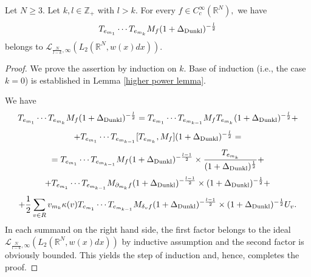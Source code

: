 \documentclass{amsart}
\begin{document}
\begin{lemma}\label{smoothness integer lemma} Let $N\geq3.$ Let $k,l\in\mathbb{Z}_+$ with $l>k.$ For every $f\in C^{\infty}_c(\mathbb{R}^N),$ we have
$$T_{e_{m_1}}\cdots T_{e_{m_k}}M_f(1+\Delta_{{\rm Dunkl}})^{-\frac{l}{2}}$$
belongs to $\mathcal{L}_{\frac{N}{l-k},\infty}(L_2(\mathbb{R}^N,w(x)dx)).$
\end{lemma}
\begin{proof} We prove the assertion by induction on $k.$ Base of induction (i.e., the case $k=0$) is established in Lemma \ref{higher power lemma}.

We have
$$T_{e_{m_1}}\cdots T_{e_{m_k}}M_f(1+\Delta_{{\rm Dunkl}})^{-\frac{l}{2}}=T_{e_{m_1}}\cdots T_{e_{m_{k-1}}}M_fT_{e_{m_k}}(1+\Delta_{{\rm Dunkl}})^{-\frac{l}{2}}+$$
$$+T_{e_{m_1}}\cdots T_{e_{m_{k-1}}}[T_{e_{m_k}},M_f](1+\Delta_{{\rm Dunkl}})^{-\frac{l}{2}}=$$
$$=T_{e_{m_1}}\cdots T_{e_{m_{k-1}}}M_f(1+\Delta_{{\rm Dunkl}})^{-\frac{l-1}{2}}\times\frac{T_{e_{m_k}}}{(1+\Delta_{{\rm Dunkl}})^{\frac12}}+$$
$$+T_{e_{m_1}}\cdots T_{e_{m_{k-1}}}M_{\partial_{m_k}f}(1+\Delta_{{\rm Dunkl}})^{-\frac{l-1}{2}}\times (1+\Delta_{{\rm Dunkl}})^{-\frac12}+$$
$$+\frac12\sum_{v\in R}v_{m_k}\kappa(v)T_{e_{m_1}}\cdots T_{e_{m_{k-1}}}M_{\delta_vf}(1+\Delta_{{\rm Dunkl}})^{-\frac{l-1}{2}}\times  (1+\Delta_{{\rm Dunkl}})^{-\frac12}U_v.$$
In each summand on the right hand side, the first factor belongs to the ideal $\mathcal{L}_{\frac{N}{l-k},\infty}(L_2(\mathbb{R}^N,w(x)dx))$ by inductive assumption and the second factor is obviously bounded. This yields the step of induction and, hence, completes the proof.
\end{proof}
\end{document}
